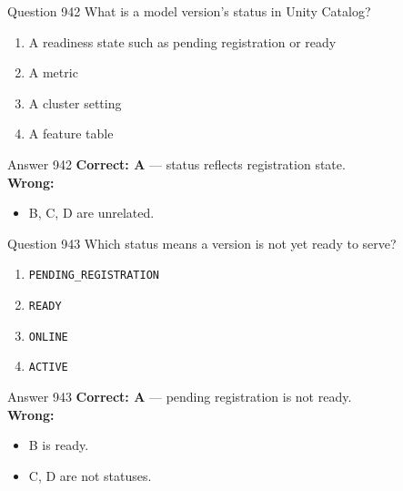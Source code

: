 \documentclass[aspectratio=169,11pt]{beamer}
\begin{document}
	\begin{frame}{Question 942}
		What is a model version's status in Unity Catalog?
		\begin{enumerate}[label=\Alph*.]
			\item A readiness state such as pending registration or ready
			\item A metric
			\item A cluster setting
			\item A feature table
		\end{enumerate}
	\end{frame}
	\begin{frame}{Answer 942}
		\textbf{Correct: A} --- status reflects registration state.\\
		\vspace{0.5em}
		\textbf{Wrong:}
		\begin{itemize}
			\item B, C, D are unrelated.
		\end{itemize}
	\end{frame}
	
	\begin{frame}{Question 943}
		Which status means a version is not yet ready to serve?
		\begin{enumerate}[label=\Alph*.]
			\item \texttt{PENDING\_REGISTRATION}
			\item \texttt{READY}
			\item \texttt{ONLINE}
			\item \texttt{ACTIVE}
		\end{enumerate}
	\end{frame}
	\begin{frame}{Answer 943}
		\textbf{Correct: A} --- pending registration is not ready.\\
		\vspace{0.5em}
		\textbf{Wrong:}
		\begin{itemize}
			\item B is ready.
			\item C, D are not statuses.
		\end{itemize}
	\end{frame}
	
\end{document}
